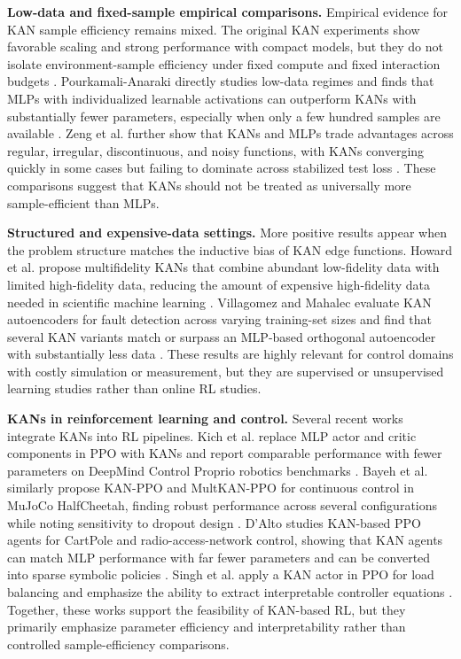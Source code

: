 \documentclass{article}
\begin{document}
\textbf{Low-data and fixed-sample empirical comparisons.}
Empirical evidence for KAN sample efficiency remains mixed.
The original KAN experiments show favorable scaling and strong performance with compact models, but they do not isolate environment-sample efficiency under fixed compute and fixed interaction budgets \cite{liu2024kan}.
Pourkamali-Anaraki directly studies low-data regimes and finds that MLPs with individualized learnable activations can outperform KANs with substantially fewer parameters, especially when only a few hundred samples are available \cite{pourkamali2025lowdata}.
Zeng et al. further show that KANs and MLPs trade advantages across regular, irregular, discontinuous, and noisy functions, with KANs converging quickly in some cases but failing to dominate across stabilized test loss \cite{zeng2024irregular}.
These comparisons suggest that KANs should not be treated as universally more sample-efficient than MLPs.

\textbf{Structured and expensive-data settings.}
More positive results appear when the problem structure matches the inductive bias of KAN edge functions.
Howard et al. propose multifidelity KANs that combine abundant low-fidelity data with limited high-fidelity data, reducing the amount of expensive high-fidelity data needed in scientific machine learning \cite{howard2024multifidelity}.
Villagomez and Mahalec evaluate KAN autoencoders for fault detection across varying training-set sizes and find that several KAN variants match or surpass an MLP-based orthogonal autoencoder with substantially less data \cite{villagomez2025kanae}.
These results are highly relevant for control domains with costly simulation or measurement, but they are supervised or unsupervised learning studies rather than online RL studies.

\textbf{KANs in reinforcement learning and control.}
Several recent works integrate KANs into RL pipelines.
Kich et al. replace MLP actor and critic components in PPO with KANs and report comparable performance with fewer parameters on DeepMind Control Proprio robotics benchmarks \cite{kich2024online}.
Bayeh et al. similarly propose KAN-PPO and MultKAN-PPO for continuous control in MuJoCo HalfCheetah, finding robust performance across several configurations while noting sensitivity to dropout design \cite{bayeh2026kanppo}.
D'Alto studies KAN-based PPO agents for CartPole and radio-access-network control, showing that KAN agents can match MLP performance with far fewer parameters and can be converted into sparse symbolic policies \cite{dalto2025explainable}.
Singh et al. apply a KAN actor in PPO for load balancing and emphasize the ability to extract interpretable controller equations \cite{singh2026loadbalancing}.
Together, these works support the feasibility of KAN-based RL, but they primarily emphasize parameter efficiency and interpretability rather than controlled sample-efficiency comparisons.
\end{document}

